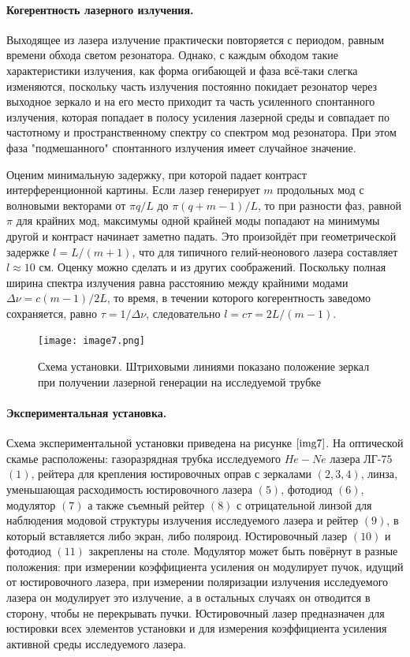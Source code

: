\documentclass[a4paper,12pt]{article} %
\begin{document}
\paragraph{Когерентность лазерного излучения.} Выходящее из лазера излучение практически повторяется с периодом, равным времени обхода светом резонатора. Однако, с каждым обходом такие характеристики излучения, как форма огибающей и фаза всё-таки слегка изменяются, поскольку часть излучения постоянно покидает резонатор через выходное зеркало и на его место приходит та часть усиленного спонтанного излучения, которая попадает в полосу усиления лазерной среды и совпадает по частотному и пространственному спектру со спектром мод резонатора. При этом фаза "подмешанного"  спонтанного излучения имеет случайное значение.

Оценим минимальную задержку, при которой падает контраст интерференционной картины. Если лазер генерирует $m$ продольных мод с волновыми векторами от $\pi q/L$ до $\pi(q+m-1)/L$, то при разности фаз, равной $\pi$ для крайних мод, максимумы одной крайней моды попадают на минимумы другой и контраст начинает заметно падать. Это произойдёт при геометрической задержке $l=L/(m+1)$, что для типичного гелий-неонового лазера составляет $l\approx10$ см. Оценку можно сделать и из других соображений. Поскольку полная ширина спектра излучения равна расстоянию между крайними модами $\Delta\nu=c(m-1)/2L$, то время, в течении которого когерентность заведомо сохраняется, равно $\tau=1/\Delta\nu$, следовательно $l=c\tau=2L/(m-1).$

\begin{figure}[h]
\begin{center}
    \texttt{[image: image7.png]}
\end{center}
    \caption{Схема установки. Штриховыми линиями показано положение зеркал при получении лазерной генерации на исследуемой трубке}
    \label{img7}
\end{figure}

\paragraph{Экспериментальная установка.} Схема экспериментальной установки приведена на рисунке $\ref{img7}$. На оптической скамье расположены: газоразрядная трубка исследуемого $He-Ne$ лазера $\text{ЛГ-75}$ $(1)$, рейтера для крепления юстировочных оправ с зеркалами $(2, 3, 4)$, линза, уменьшающая расходимость юстировочного лазера $(5)$, фотодиод $(6)$, модулятор $(7)$ а также съемный рейтер $(8)$ с отрицательной линзой для наблюдения модовой структуры излучения исследуемого лазера и рейтер $(9)$, в который вставляется либо экран, либо поляроид. Юстировочный лазер $(10)$ и фотодиод
$(11)$ закреплены на столе. Модулятор может быть повёрнут в разные положения: при измерении коэффициента усиления он модулирует пучок, идущий от юстировочного лазера, при измерении поляризации излучения исследуемого лазера он модулирует это излучение, а в остальных случаях он отводится в сторону, чтобы не перекрывать пучки. Юстировочный лазер предназначен для юстировки всех элементов установки и для измерения коэффициента усиления активной среды исследуемого лазера.
\end{document}
